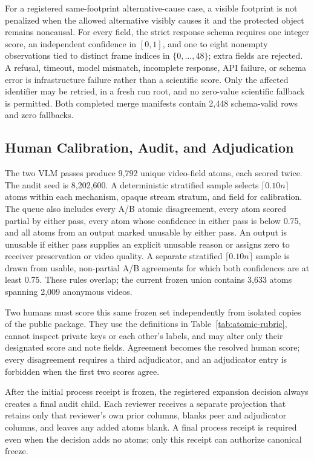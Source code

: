 For a registered same-footprint alternative-cause case, a visible footprint
is not penalized when the allowed alternative visibly causes it and the
protected object remains noncausal.  For every field, the strict response
schema requires one integer score, an independent confidence in \([0,1]\),
and one to eight nonempty observations tied to distinct frame indices in
\(\{0,\ldots,48\}\); extra fields are rejected.  A refusal, timeout, model
mismatch, incomplete response, API failure, or schema error is infrastructure
failure rather than a scientific score.  Only the affected identifier may be
retried, in a fresh run root, and no zero-value scientific fallback is
permitted.  Both completed merge manifests contain 2,448 schema-valid rows
and zero fallbacks.

\subsection{Human Calibration, Audit, and Adjudication}
\label{app:human-audit}

The two VLM passes produce 9,792 unique video-field atoms, each scored twice.
The audit seed is 8,202,600.  A deterministic stratified sample selects
\(\lceil0.10n\rceil\) atoms within each mechanism, opaque stream stratum, and
field for calibration.  The queue also includes every A/B atomic disagreement,
every atom scored partial by either pass, every atom whose confidence in
either pass is below 0.75, and all atoms from an output marked unusable by
either pass.  An output is unusable if either pass supplies an explicit
unusable reason or assigns zero to receiver preservation or video quality.
A separate stratified \(\lceil0.10n\rceil\) sample is drawn from usable,
non-partial A/B agreements for which both confidences are at least 0.75.
These rules overlap;
the current frozen union contains 3,633 atoms spanning 2,009 anonymous videos.

Two humans must score this same frozen set independently from isolated copies
of the public package.  They use the definitions in
Table~\ref{tab:atomic-rubric}, cannot inspect private keys or each other's
labels, and may alter only their designated score and note fields.  Agreement
becomes the resolved human score; every disagreement requires a third
adjudicator, and an adjudicator entry is forbidden when the first two scores
agree.

After the initial process receipt is frozen, the registered expansion
decision always creates a final audit child.  Each reviewer receives a
separate projection that retains only that reviewer's own prior columns,
blanks peer and adjudicator columns, and leaves any added atoms blank.  A
final process receipt is required even when the decision adds no atoms; only
this receipt can authorize canonical freeze.

